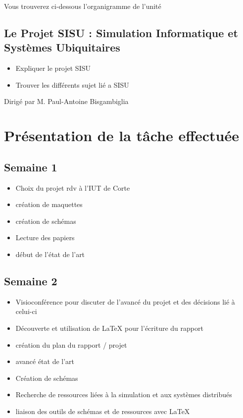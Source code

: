 \documentclass{rapport_stage}
\begin{document}
Vous trouverez ci-dessous l'organigramme de l'unité \cite*{noauthor_overview_nodate}

\section*{Le Projet SISU : Simulation Informatique et Systèmes Ubiquitaires}

\begin{itemize}[label=$\bullet$]
  \item Expliquer le projet SISU
  \item Trouver les différents sujet lié a SISU
\end{itemize}

Dirigé par M. Paul-Antoine Bisgambiglia

\cleardoublepage

\chapter{Présentation de la tâche effectuée}

\section*{Semaine 1}

\begin{itemize}[label=$\bullet$]
  \item Choix du projet rdv à l’IUT de Corte
  \item création de maquettes
  \item création de schémas
  \item Lecture des papiers
  \item début de l'état de l'art
\end{itemize}

\section*{Semaine 2}

\begin{itemize}[label=$\bullet$]
  \item Visioconférence pour discuter de l'avancé du projet et des décisions lié à celui-ci
  \item Découverte et utilisation de LaTeX pour l'écriture du rapport
  \item création du plan du rapport / projet
  \item avancé état de l'art
  \item Création de schémas
  \item Recherche de ressources liées à la simulation et aux systèmes distribués
  \item liaison des outils de schémas et de ressources avec LaTeX
\end{itemize}
\end{document}
